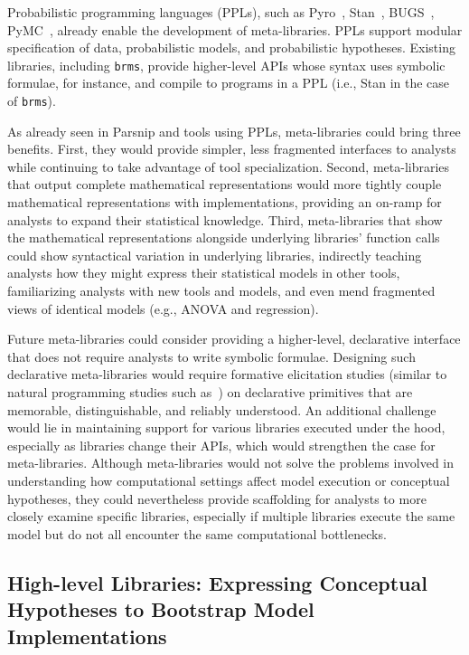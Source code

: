 Probabilistic programming languages (PPLs), such as Pyro~\cite{pyro}, Stan~\cite{stan},
BUGS~\cite{bugs}, PyMC~\cite{pymc3}, already enable the development of
meta-libraries. PPLs support modular specification of data, probabilistic
models, and probabilistic hypotheses. Existing libraries, including
\texttt{brms}, provide higher-level APIs whose syntax uses symbolic formulae,
for instance, and compile to programs in a PPL (i.e., Stan in the case of
\texttt{brms}). 

As already seen in Parsnip and tools using PPLs, meta-libraries could
bring three benefits. First, they would provide simpler, less fragmented
interfaces to analysts while continuing to take advantage of tool
specialization. Second, meta-libraries that output complete mathematical
representations would more tightly couple mathematical representations with
implementations, providing an on-ramp for analysts to expand their statistical
knowledge. Third, meta-libraries that show the mathematical representations
alongside underlying libraries' function calls could show syntactical variation
in underlying libraries, indirectly teaching analysts how they might express
their statistical models in other tools, familiarizing analysts with new tools
and models, and even mend fragmented views of identical models (e.g., ANOVA and
regression). 

Future meta-libraries could consider providing a higher-level, declarative
interface that does not require analysts to write symbolic formulae. Designing
such declarative meta-libraries would require formative elicitation studies
(similar to natural programming studies such as~\cite{verou2018extending}) on
declarative primitives that are memorable, distinguishable, and reliably
understood. An additional challenge would lie in maintaining support for various
libraries executed under the hood, especially as libraries change their APIs,
which would strengthen the case for meta-libraries. Although meta-libraries
would not solve the problems involved in understanding how computational
settings affect model execution or conceptual hypotheses, they could
nevertheless provide scaffolding for analysts to more closely examine specific
libraries, especially if multiple libraries execute the same model but do not
all encounter the same computational bottlenecks. 

\subsection{High-level Libraries: Expressing Conceptual Hypotheses to Bootstrap Model Implementations}

